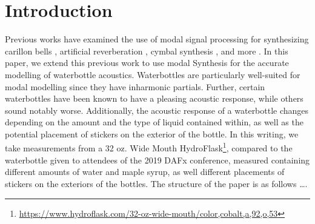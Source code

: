 \documentclass[twoside,a4paper]{article}
\title{\papertitle}
\affiliation{
\paperauthorA \, }
{\href{http://ccrma.stanford.edu}{Center for Computer Research in Music and Acoustics} \\ Stanford University \\ Palo Alto, CA \\ {\tt\{kermit|mrau|jatin\}@ccrma.stanford.edu}}
\newif\ifpdf
\begin{document}
\ifpdf %
  \DeclareGraphicsExtensions{.png,.jpg,.pdf}
\else  %
\fi

\maketitle
%
\begin{abstract}
We present a method for accurately synthesizing the acoustic response
of a waterbottle using modal decomposition.
\end{abstract}

\section{Introduction} \label{sec:intro}
%
Previous works have examined the use of modal signal processing
for synthesizing carillon bells
\cite{canfielddafilou:werner:bellEffects:2017,rau:das:canfielddafilou:carillon:2019},
artificial reverberation \cite{abel2014a}, cymbal synthesis \cite{travis_cymbals},
and more \cite{abel_kurt_modal}.
In this paper, we extend this previous work to use modal Synthesis
for the accurate modelling of waterbottle acoustics. Waterbottles are
particularly well-suited for modal modelling since they have inharmonic
partials. Further, certain waterbottles have been known to have a
pleasing acoustic response, while others sound notably worse.
Additionally, the acoustic response of a waterbottle changes
depending on the amount and the type of liquid contained within, as
well as the potential placement of stickers on the exterior of the bottle.
In this writing, we take measurements from a 32 oz. Wide Mouth
HydroFlask\footnote{\url{https://www.hydroflask.com/32-oz-wide-mouth/color,cobalt,a,92,o,53}},
compared to the waterbottle given to attendees of the 2019 DAFx
conference, measured containing different amounts of water and maple
syrup, as well different placements of stickers on the exteriors of the
bottles.
\newline\newline
The structure of the paper is as follows \dots.
\end{document}
